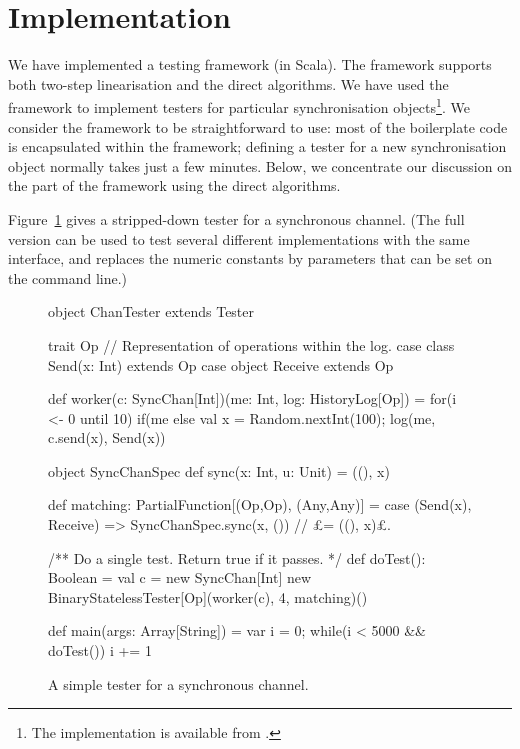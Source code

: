 \section{Implementation}
\label{sec:implementation}

We have implemented a testing framework (in Scala).  The framework supports
both two-step linearisation and the direct algorithms.  We have used the
framework to implement testers for particular synchronisation
objects\footnote{The implementation is available from .}.  We
consider the framework to be straightforward to use: most of the boilerplate
code is encapsulated within the framework; defining a tester for a new
synchronisation object normally takes just a few minutes.  Below, we
concentrate our discussion on the part of the framework using the direct
algorithms.

Figure~\ref{fig:ChanTester} gives a stripped-down tester for a synchronous
channel.  (The full version can be used to test several different
implementations with the same interface, and replaces the numeric constants by
parameters that can be set on the command line.)


\begin{figure}
\begin{scala}
object ChanTester extends Tester{
  trait Op   // Representation of operations within the log.
  case class Send(x: Int) extends Op
  case object Receive extends Op

  def worker(c: SyncChan[Int])(me: Int, log: HistoryLog[Op]) = 
    for(i <- 0 until 10)
      if(me%
      else{ val x = Random.nextInt(100); log(me, c.send(x), Send(x)) }

  object SyncChanSpec{
    def sync(x: Int, u: Unit) = ((), x)    
  }

  def matching: PartialFunction[(Op,Op), (Any,Any)] = {
    case (Send(x), Receive) => SyncChanSpec.sync(x, ()) // £= ((), x)£.
  }

  /** Do a single test.  Return true if it passes. */
  def doTest(): Boolean = {
    val c = new SyncChan[Int]
    new BinaryStatelessTester[Op](worker(c), 4, matching)()
  }

  def main(args: Array[String]) = {
    var i = 0; while(i < 5000 && doTest()) i += 1
  }
}
\end{scala}
\caption{A simple tester for a synchronous channel. \label{fig:ChanTester}}
\end{figure}

